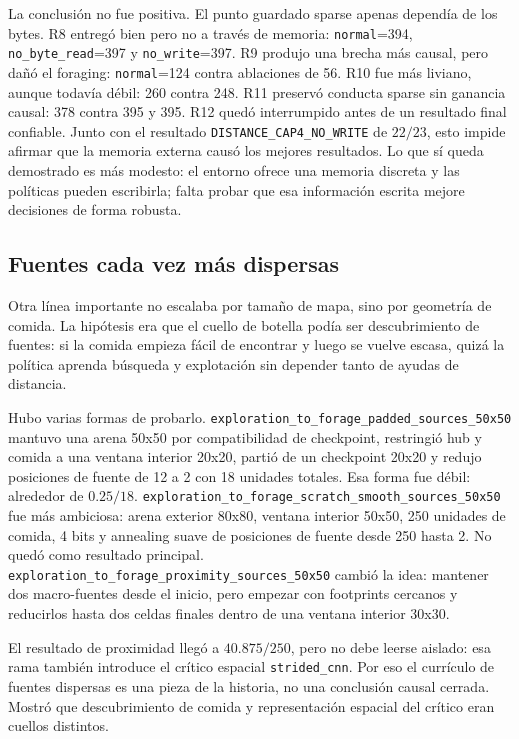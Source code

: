 \documentclass[11pt,a4paper]{article}
\newcommand{\run}[1]{\nolinkurl{#1}}
\begin{document}
La conclusión no fue positiva. El punto guardado sparse apenas dependía de los bytes. R8 entregó bien pero no a través de memoria: \run{normal}=394, \run{no_byte_read}=397 y \run{no_write}=397. R9 produjo una brecha más causal, pero dañó el foraging: \run{normal}=124 contra ablaciones de 56. R10 fue más liviano, aunque todavía débil: 260 contra 248. R11 preservó conducta sparse sin ganancia causal: 378 contra 395 y 395. R12 quedó interrumpido antes de un resultado final confiable. Junto con el resultado \run{DISTANCE_CAP4_NO_WRITE} de \(22/23\), esto impide afirmar que la memoria externa causó los mejores resultados. Lo que sí queda demostrado es más modesto: el entorno ofrece una memoria discreta y las políticas pueden escribirla; falta probar que esa información escrita mejore decisiones de forma robusta.

\subsection{Fuentes cada vez más dispersas}

Otra línea importante no escalaba por tamaño de mapa, sino por geometría de comida. La hipótesis era que el cuello de botella podía ser descubrimiento de fuentes: si la comida empieza fácil de encontrar y luego se vuelve escasa, quizá la política aprenda búsqueda y explotación sin depender tanto de ayudas de distancia.

Hubo varias formas de probarlo. \run{exploration_to_forage_padded_sources_50x50} mantuvo una arena 50x50 por compatibilidad de checkpoint, restringió hub y comida a una ventana interior 20x20, partió de un checkpoint 20x20 y redujo posiciones de fuente de 12 a 2 con 18 unidades totales. Esa forma fue débil: alrededor de \(0.25/18\). \run{exploration_to_forage_scratch_smooth_sources_50x50} fue más ambiciosa: arena exterior 80x80, ventana interior 50x50, 250 unidades de comida, 4 bits y annealing suave de posiciones de fuente desde 250 hasta 2. No quedó como resultado principal. \run{exploration_to_forage_proximity_sources_50x50} cambió la idea: mantener dos macro-fuentes desde el inicio, pero empezar con footprints cercanos y reducirlos hasta dos celdas finales dentro de una ventana interior 30x30.

El resultado de proximidad llegó a \(40.875/250\), pero no debe leerse aislado: esa rama también introduce el crítico espacial \run{strided_cnn}. Por eso el currículo de fuentes dispersas es una pieza de la historia, no una conclusión causal cerrada. Mostró que descubrimiento de comida y representación espacial del crítico eran cuellos distintos.
\end{document}
